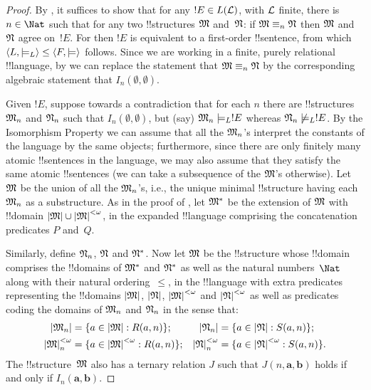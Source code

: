 \documentclass[../../../include/open-logic-section]{subfiles}
\begin{document}
\begin{proof}
By , it suffices to show that for any $!E
\in L(\Lang{L})$, with $\Lang{L}$ finite, there is $n \in \Nat$
such that for any two !!{structure}s $\Struct{M}$ and~$\Struct{N}$: if
$\Struct{M} \equiv_n \Struct{N}$ then $\Struct{M}$ and $\Struct{N}$
agree on~$!E$. For then $!E$ is equivalent to a first-order
!!{sentence}, from which $\langle L, \models_L \rangle \le \langle F, \models \rangle$
follows. Since we are working in a finite, purely relational
!!{language}, by  we can replace the statement
that $\Struct{M} \equiv_n \Struct{N}$ by the corresponding algebraic
statement that $I_n(\emptyset,\emptyset)$.

Given $!E$, suppose towards a contradiction that for each $n$ there
are !!{structure}s $\Struct{M}_n$ and $\Struct{N}_n$ such that
$I_n(\emptyset, \emptyset)$, but (say) $\Struct{M}_n \models_L !E$
whereas $\Struct{N}_n \not\models_L !E$. By the Isomorphism Property
we can assume that all the $\Struct{M}_n$'s interpret the constants of
the language by the same objects; furthermore, since there are only
finitely many atomic !!{sentence}s in the language, we may also assume
that they satisfy the same atomic !!{sentence}s (we can take a
subsequence of the $\Struct{M}$'s otherwise). Let $\Struct{M}$ be the
union of all the $\Struct{M}_n$'s, i.e., the unique minimal
!!{structure} having each $\Struct{M}_n$ as a substructure.  As in the
proof of , let $\Struct{M}^*$ be the
extension of $\Struct{M}$ with !!{domain} $\Domain{M} \cup
\Domain{M}^{<\omega}$, in the expanded !!{language} comprising the
concatenation predicates $P$ and~$Q$.

Similarly, define $\Struct{N}_n$, $\Struct{N}$ and $\Struct{N}^*$. Now
let $\Struct{M}$ be the !!{structure} whose !!{domain} comprises the
!!{domain}s of $\Struct{M}^*$ and $\Struct{N}^*$ as well as the natural
numbers~$\Nat$ along with their natural ordering~$\le$, in the
!!{language} with extra predicates representing the !!{domain}s
$\Domain{M}$, $\Domain{N}$, $\Domain{M}^{<\omega}$ and
$\Domain{N}^{<\omega}$ as well as predicates coding the domains of
$\Struct{M}_n$ and $\Struct{N}_n$ in the sense that:
\begin{align*}
  \Domain{M_n} & = \Setabs{a \in \Domain{M}}{R(a, n)}; & 
  \Domain{N_n} & = \Setabs{a \in \Domain{N}}{S(a,n)}; \\
  \Domain{M}^{<\omega}_n & = \Setabs{a \in \Domain{M}^{<\omega}}{R(a,n)}; &
  \Domain{N}^{<\omega}_n & = \Setabs{a \in \Domain{N}^{<\omega}}{S(a,n)}. 
\end{align*}
The !!{structure}~$\Struct{M}$ also has a ternary relation $J$ such
that $J(n, \mathbf{a}, \mathbf{b})$ holds if and only if
$I_n(\mathbf{a}, \mathbf{b})$.


\end{proof}
\end{document}
